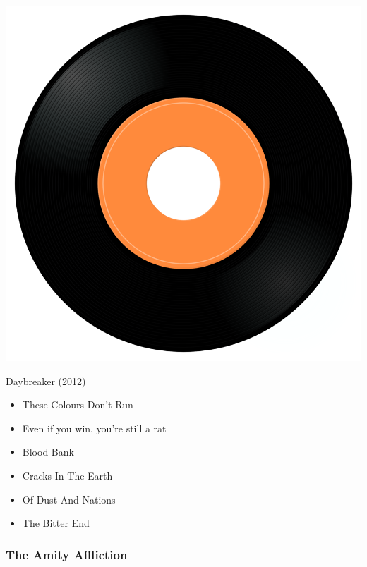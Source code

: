 \begin{minipage}[t]{0.25\textwidth}\vspace{0pt}
\captionsetup{type=figure}
\includegraphics[width=\textwidth]{Images/cover.png}
\caption*{Daybreaker (2012)}
\end{minipage}
\begin{minipage}[t]{0.25\textwidth}\vspace{0pt}
\begin{itemize}[nosep,leftmargin=1em,labelwidth=*,align=left]
	\setlength{\itemsep}{0pt}
	\item These Colours Don’t Run
	\item Even if you win, you're still a rat
	\item Blood Bank
	\item Cracks In The Earth
	\item Of Dust And Nations
	\item The Bitter End
\end{itemize}
\end{minipage}

\subsubsection{The Amity Affliction}

